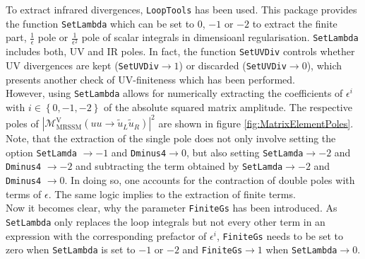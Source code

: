 To extract infrared divergences, \texttt{LoopTools}\cite{Hahn:1998} has been used. This package provides the function \texttt{SetLambda} which can be set to 0, $-1$ or $-2$ to extract the finite part, $\frac{1}{\epsilon}$ pole or $\frac{1}{\epsilon^2}$ pole of scalar integrals in dimensioanl regularisation. \texttt{SetLambda} includes both, UV and IR poles. In fact, the function \texttt{SetUVDiv} controls whether UV divergences are kept (\texttt{SetUVDiv}$\to 1$) or discarded (\texttt{SetUVDiv}$\to 0$), which presents another check of UV-finiteness which has been performed.\\
However, using \texttt{SetLambda} allows for numerically extracting the coefficients of $\epsilon^i$ with $i \in \left\{ 0,-1,-2 \right\}$ of the absolute squared matrix amplitude. The respective poles of $|\mathcal{M}^{\mathrm{V}}_{\mathrm{MRSSM}}(uu \to \tilde{u}_L\tilde{u}_R)|^2$ are shown in figure \ref{fig:MatrixElementPoles}. Note, that the extraction of the single pole does not only involve setting the option \texttt{SetLamda} $\to-1$ and \texttt{Dminus4}$\to 0$, but also setting \texttt{SetLamda}$\to -2$ and \texttt{Dminus4} $\to -2$ and subtracting the term obtained by \texttt{SetLamda}$\to-2$ and \texttt{Dminus4} $\to 0$. In doing so, one accounts for the contraction of double poles with terms of $\mathcal{\epsilon}$. The same logic implies to the extraction of finite terms.\\
Now it becomes clear, why the parameter \texttt{FiniteGs} has been introduced. As \texttt{SetLambda} only replaces the loop integrals but not every other term in an expression with the corresponding prefactor of $\epsilon^i$, \texttt{FiniteGs} needs to be set to zero when \texttt{SetLambda} is set to $-1$ or $-2$ and \texttt{FiniteGs}$\to 1$ when \texttt{SetLambda}$\to 0$.
